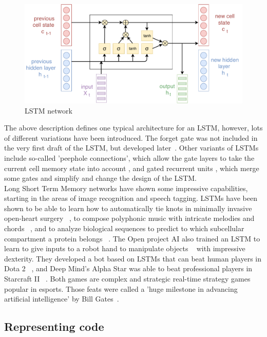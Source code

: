 \documentclass[
a4paper,
pagesize,
pdftex,
12pt,
twoside, %
BCOR=5mm, %
ngerman,
fleqn,
final,
]{scrartcl}
\begin{document}
	\begin{figure}[ht]
		\centering
		\includegraphics[width=\linewidth]{img/LSTM}
		\caption{LSTM network}
		\label{fig:architectureLSTM}
	\end{figure}
	
	The above description defines one typical architecture for an LSTM, however, lots of different variations have been introduced. The forget gate was not included in the very first draft of the LSTM, but developed later~\cite{Gers.1999}. Other variants of LSTMs include so-called 'peephole connections', which allow the gate layers to take the current cell memory state into account \cite{Gers.2000}, and gated recurrent units \cite{Cho.2014}, which merge some gates and simplify and change the design of the LSTM. \\
	Long Short Term Memory networks have shown some impressive capabilities, starting in the areas of image recognition and speech tagging. LSTMs have been shown to be able to learn how to automatically tie knots in minimally invasive open-heart surgery ~\cite{Mayer.2008}, to compose polyphonic music with intricate melodies and chords ~\cite{Kumar.2019}, and to analyze biological sequences to predict to which subcellular compartment a protein belongs ~\cite{Snderby.2015}. The Open project AI also trained an LSTM to learn to give inputs to a robot hand to manipulate objects ~\cite{OpenAIBlog.2018} with impressive dexterity. They developed a bot based on LSTMs that can beat human players in Dota 2 ~\cite{Rodriguez.2018}, and Deep Mind's Alpha Star was able to beat professional players in Starcraft II ~\cite{Stanford.2019}. Both games are complex and strategic real-time strategy games popular in esports. Those feats were called a 'huge milestone in advancing artificial intelligence' by Bill Gates~\cite{Gates2019}. 
	
	\subsection{Representing code}
	
\end{document}

